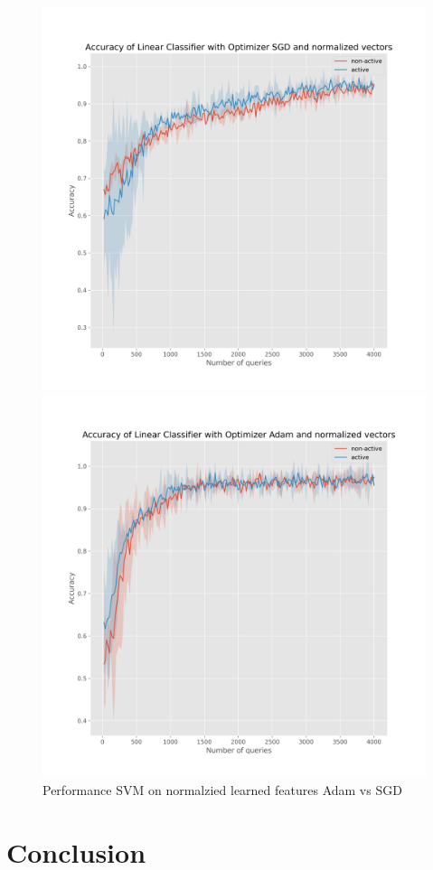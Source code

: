 \documentclass{article}
\begin{document}
\begin{figure}[!h]
  \centering
  \begin{minipage}{.55\textwidth}
    \centering
    \includegraphics[width=\linewidth]{active-vs-base-moons-linear-loss-SGD-normalized-ci}
  \end{minipage}%
  \begin{minipage}{.55\textwidth}
    \centering
    \includegraphics[width=\linewidth]{active-vs-base-moons-linear-loss-Adam-normalized-ci}
  \end{minipage}
  \caption{Performance SVM on normalzied learned features Adam vs SGD}
  \label{fig:svm-normalized-ci}
\end{figure}

\section{Conclusion}




\end{document}
